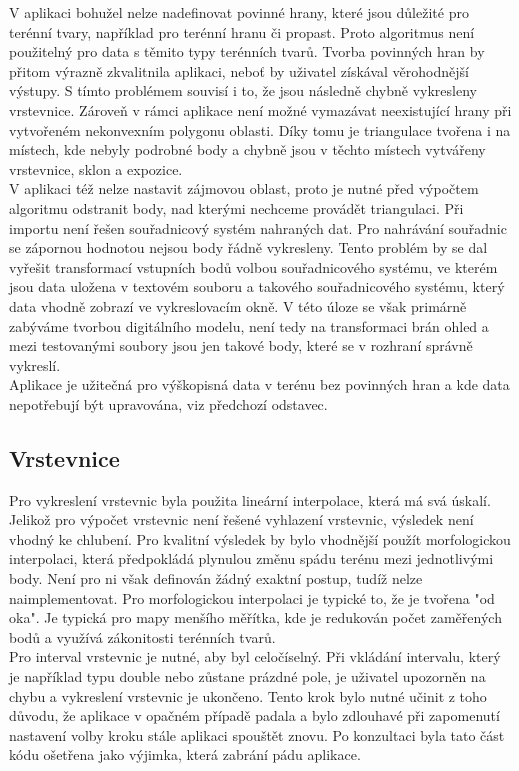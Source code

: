 \documentclass[a4paper, 12pt]{article}
\begin{document}
V aplikaci bohužel nelze nadefinovat povinné hrany, které jsou důležité pro terénní tvary, například pro terénní hranu či propast. Proto algoritmus není použitelný pro data s těmito typy terénních tvarů. Tvorba povinných hran by přitom výrazně zkvalitnila aplikaci, neboť by uživatel získával věrohodnější výstupy. S tímto problémem souvisí i to, že jsou následně chybně vykresleny vrstevnice. Zároveň v rámci aplikace není možné vymazávat neexistující hrany při vytvořeném nekonvexním polygonu oblasti. Díky tomu je triangulace tvořena i na místech, kde nebyly podrobné body a chybně jsou v těchto místech vytvářeny vrstevnice, sklon a expozice. \\

V aplikaci též nelze nastavit zájmovou oblast, proto je nutné před výpočtem algoritmu odstranit body, nad kterými nechceme provádět triangulaci. Při importu není řešen souřadnicový systém nahraných dat. Pro nahrávání souřadnic se zápornou hodnotou nejsou body řádně vykresleny. Tento problém by se dal vyřešit transformací vstupních bodů volbou souřadnicového systému, ve kterém jsou data uložena v textovém souboru a takového souřadnicového systému, který data vhodně zobrazí ve vykreslovacím okně. V této úloze se však primárně zabýváme tvorbou digitálního modelu, není tedy na transformaci brán ohled a mezi testovanými soubory jsou jen takové body, které se v rozhraní správně vykreslí. \\

Aplikace je užitečná pro výškopisná data v terénu bez povinných hran a kde data nepotřebují být upravována, viz předchozí odstavec. \\

\subsection{Vrstevnice}
Pro vykreslení vrstevnic byla použita lineární interpolace, která má svá úskalí. Jelikož pro výpočet vrstevnic není řešené vyhlazení vrstevnic, výsledek není vhodný ke chlubení. Pro kvalitní výsledek by bylo vhodnější použít morfologickou interpolaci, která předpokládá plynulou změnu spádu terénu mezi jednotlivými body. Není pro ni však definován žádný exaktní postup, tudíž nelze naimplementovat. Pro morfologickou interpolaci je typické to, že je tvořena "od oka". Je typická pro mapy menšího měřítka, kde je redukován počet zaměřených bodů a využívá zákonitosti terénních tvarů. \\

Pro interval vrstevnic je nutné, aby byl celočíselný. Při vkládání intervalu, který je například typu double nebo zůstane prázdné pole, je uživatel upozorněn na chybu a vykreslení vrstevnic je ukončeno. Tento krok bylo nutné učinit z toho důvodu, že aplikace v opačném případě padala a bylo zdlouhavé při zapomenutí nastavení volby kroku stále aplikaci spouštět znovu. Po konzultaci byla tato část kódu ošetřena jako výjimka, která zabrání pádu aplikace. \\
\end{document}
